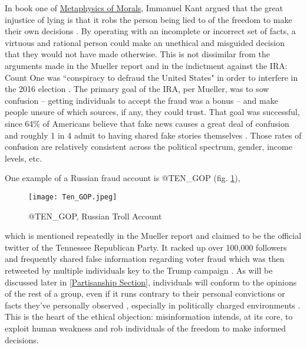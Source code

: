 \documentclass[preprint,review,12pt]{elsarticle}
\begin{document}
In book one of \underline{Metaphysics of Morals}, Immanuel Kant argued that the great injustice of lying is that it robs the person being lied to of the freedom to make their own decisions \cite{kant1996metaphysics}. By operating with an incomplete or incorrect set of facts, a virtuous and rational person could make an unethical and misguided decision that they would not have made otherwise. This is not dissimilar from the arguments made in the Mueller report and in the indictment against the IRA: Count One was ``conspiracy to defraud the United States" in order to interfere in the 2016 election  \cite{mueller2019mueller,mueller2020internet}. The primary goal of the IRA, per Mueller, was to sow confusion -- getting individuals to accept the fraud was a bonus -- and make people unsure of which sources, if any, they could trust. That goal was successful, since 64\% of Americans believe that fake news causes a great deal of confusion and roughly 1 in 4 admit to having shared fake stories themselves \cite{barthel2016americans}. Those rates of confusion are relatively consistent across the political spectrum, gender, income levels, etc. 

One example of a Russian fraud account is @TEN\_GOP (fig. \ref{fig:Russian Troll Account @TEN_GOP}), \begin{figure}[h]
    \centering
    \texttt{[image: Ten\_GOP.jpeg]}
    \caption{@TEN\_GOP, Russian Troll Account}
    \label{fig:Russian Troll Account @TEN_GOP}
\end{figure} which is mentioned repeatedly in the Mueller report and claimed to be the official twitter of the Tennessee Republican Party. It racked up over 100,000 followers and frequently shared false information regarding voter fraud which was then retweeted by multiple individuals key to the Trump campaign \cite{mueller2019mueller}. As will be discussed later in \ref{Partisanship Section}, individuals will conform to the opinions of the rest of a group, even if it runs contrary to their personal convictions or facts they've personally observed \cite{asch1956studies}, especially in politically charged environments \cite{bullock2007experiments,housholder2014facebook}. This is the heart of the ethical objection: misinformation intends, at its core, to exploit human weakness and rob individuals of the freedom to make informed decisions.
\end{document}
